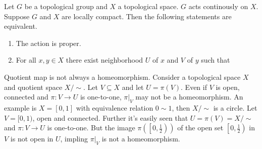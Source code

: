 \documentclass{note}
\begin{document}

\begin{proposition*}
  Let $G$ be a topological group and $X$ a topological space. $G$ acts
  continously on $X$. Suppose $G$ and $X$ are locally compact. Then
  the following statements are equivalent.
  \begin{enumerate}
  \item The action is proper.
  \item For all $x,y\in X$ there exist neighborhood $U$ of $x$ and $V$
    of $y$ such that
  \end{enumerate}
\end{proposition*}


Quotient map is not always a homeomorphism. Consider a topological
space $X$ and quotient space $X/{\sim}$. Let $V\subseteq X$ and let
$U=\pi(V)$. Even if $V$ is open, connected and $\pi\colon V\to U$ is
one-to-one, $\pi|_V$ may not be a homeomorphism. An example is
$X=[0,1]$ with equivalence relation $0\sim 1$, then $X/{\sim}$ is a
circle. Let $V=[0,1)$, open and connected. Further it's easily seen
that $U=\pi(V)=X/{\sim}$ and $\pi\colon V\to U$ is one-to-one. But the
image $\pi\left(\left[0,\frac{1}{2}\right)\right)$ of the open set
$\left[0,\frac{1}{2}\right)$ in $V$ is not open in $U$, impling
$\pi|_V$ is not a homeomorphism.
\end{document}
